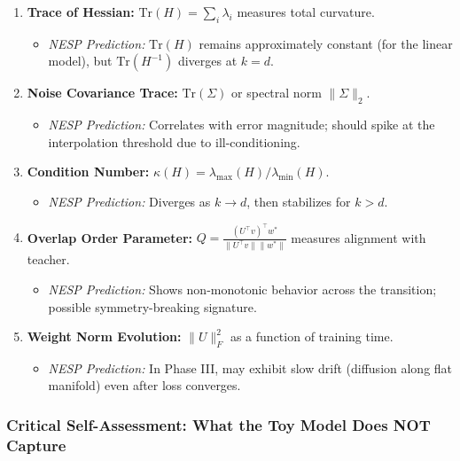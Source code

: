 \documentclass[
  journal=largetwo,
  year=2025,
  volume=37,
]{cup-journal}
\begin{document}
\begin{enumerate}
    \item \textbf{Trace of Hessian:} $\text{Tr}(H) = \sum_i \lambda_i$ measures total curvature.
    \begin{itemize}
        \item \textit{NESP Prediction:} $\text{Tr}(H)$ remains approximately constant (for the linear model), but $\text{Tr}(H^{-1})$ diverges at $k = d$.
    \end{itemize}
    
    \item \textbf{Noise Covariance Trace:} $\text{Tr}(\Sigma)$ or spectral norm $\|\Sigma\|_2$.
    \begin{itemize}
        \item \textit{NESP Prediction:} Correlates with error magnitude; should spike at the interpolation threshold due to ill-conditioning.
    \end{itemize}
    
    \item \textbf{Condition Number:} $\kappa(H) = \lambda_{\max}(H)/\lambda_{\min}(H)$.
    \begin{itemize}
        \item \textit{NESP Prediction:} Diverges as $k \to d$, then stabilizes for $k > d$.
    \end{itemize}
    
    \item \textbf{Overlap Order Parameter:} $Q = \frac{(U^\top v)^\top w^*}{\|U^\top v\| \|w^*\|}$ measures alignment with teacher.
    \begin{itemize}
        \item \textit{NESP Prediction:} Shows non-monotonic behavior across the transition; possible symmetry-breaking signature.
    \end{itemize}
    
    \item \textbf{Weight Norm Evolution:} $\|U\|_F^2$ as a function of training time.
    \begin{itemize}
        \item \textit{NESP Prediction:} In Phase III, may exhibit slow drift (diffusion along flat manifold) even after loss converges.
    \end{itemize}
\end{enumerate}



\subsubsection{Critical Self-Assessment: What the Toy Model Does NOT Capture}
\end{document}
